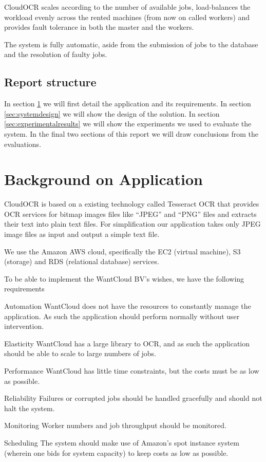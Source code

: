 \documentclass[a4paper]{IEEEtran}
\begin{document}
CloudOCR scales according to the number of available jobs, load-balances the workload evenly across the rented machines (from now on called workers) and provides fault tolerance in both the master and the workers. 

The system is fully automatic, aside from the submission of jobs to the database and the resolution of faulty jobs.
\newpage
\subsection*{Report structure}
In section \ref{sec:backgroundonapplication} we will first detail the application and its requirements. In section \ref{sec:systemdesign} we will show the design of the solution. In section \ref{sec:experimentalresults} we will show the experiments we used to evaluate the system.
In the final two sections of this report we will draw conclusions from the evaluations.

\section{Background on Application}
\label{sec:backgroundonapplication}
CloudOCR is based on a existing technology called Tesseract OCR \cite{tesseractocr} that provides OCR services for bitmap images files like ``JPEG'' and ``PNG'' files and extracts their text into plain text files. For simplification our application takes only JPEG image files as input and output a simple text file.

We use the Amazon AWS cloud, specifically the EC2 (virtual machine), S3 (storage) and RDS (relational database) services.

To be able to implement the WantCloud BV's wishes, we have the following requirements
\begin{LaTeXdescription}
	\item[Automation] WantCloud does not have the resources to constantly manage the application. As such the application should perform normally without user intervention.
	\item[Elasticity] WantCloud has a large library to OCR, and as such the application should be able to scale to large numbers of jobs.
	\item[Performance] WantCloud has little time constraints, but the costs must be as low as possible.
	\item[Reliability] Failures or corrupted jobs should be handled gracefully and should not halt the system.
	\item[Monitoring] Worker numbers and job throughput should be monitored.
	\item[Scheduling] The system should make use of Amazon's spot instance system (wherein one bids for system capacity) to keep costs as low as possible.
\end{LaTeXdescription}
 \newpage
\end{document}
